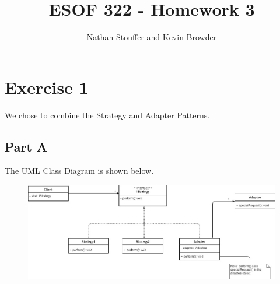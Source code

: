 \documentclass{article}
\begin{document}
	
\title{ESOF 322 - Homework 3}
\author{Nathan Stouffer and Kevin Browder}

\maketitle
\newpage

\section*{Exercise 1}
We chose to combine the Strategy and Adapter Patterns.

\subsection*{Part A}
The UML Class Diagram is shown below. \\
\begin{figure}[h]
	\centering
	\includegraphics[width=6in]{hw3-class-diagram.jpg}
\end{figure}
\end{document}
